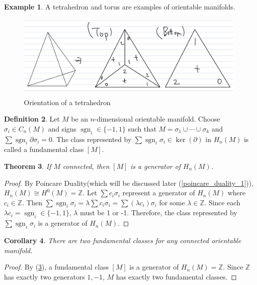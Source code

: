 \documentclass[psamsfonts]{amsart}
\newtheorem{thm}{Theorem}[section]
\newtheorem{cor}[thm]{Corollary}
\theoremstyle{definition}
\newtheorem{defn}[thm]{Definition}
\newtheorem{exmp}[thm]{Example}
\theoremstyle{rem}
\DeclareMathOperator{\sgn}{sgn}
\numberwithin{equation}{section}
\begin{document}
\begin{exmp}
  A tetrahedron and torus are examples of orientable manifolds.
  \begin{figure}[!htb]
    \includegraphics[width=.5\linewidth]{img/orientation_tetrahedron.jpeg}
    \caption{Orientation of a tetrahedron}
    \label{fig:orientation_tetrahedron}
  \end{figure}
\end{exmp}

\begin{defn}
  Let $M$ be an $n$-dimensional orientable manifold.
  Choose $\sigma_i \in C_n(M)$ and signs $\sgn_i \in \{ -1, 1 \}$ such that $M = \sigma_1 \cup \cdots \cup \sigma_k$ and $\sum \sgn_i \partial \sigma_i = 0$.
  The class represented by $\sum \sgn_i \sigma_i \in \ker(\partial)$ in $H_n(M)$ is called a fundamental class $[M]$.
\end{defn}

\begin{thm}\label{fundamental_class_generator}
  If $M$ connected, then $[M]$ is a generator of $H_n(M)$.
\end{thm}

\begin{proof}
  By Poincare Duality(which will be discussed later (\ref{poincare_duality_1})), $H_n(M) \cong H^0(M) = \mathbb{Z}$.
  Let $\sum c_i \sigma_i$ represent a generator of $H_n(M)$ where $c_i \in \mathbb{Z}$.
  Then $\sum \sgn_i \sigma_i = \lambda\sum c_i \sigma_i = \sum (\lambda c_i) \sigma_i$ for some $\lambda \in \mathbb{Z}$.
  Since each $\lambda c_i = \sgn_i \in \{ -1, 1 \}$, $\lambda$ must be 1 or -1.
  Therefore, the class represented by $\sum \sgn_i \sigma_i$ is a generator of $H_n(M)$.
\end{proof}

\begin{cor}
  There are two fundamental classes for any connected orientable manifold.
\end{cor}

\begin{proof}
  By (\ref{fundamental_class_generator}), a fundamental class $[M]$ is a generator of $H_n(M) = \mathbb{Z}$.
  Since $\mathbb{Z}$ has exactly two generators $1, -1$, $M$ has exactly two fundamental classes.
\end{proof}
\end{document}
